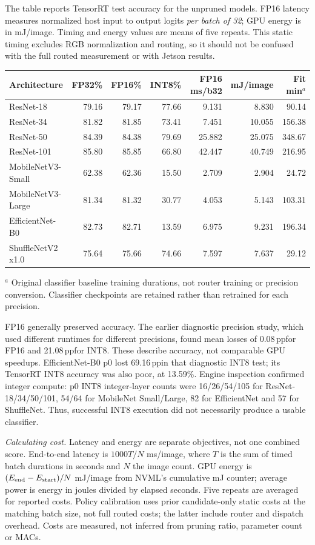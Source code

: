 \documentclass[10pt,a4paper]{article}
\newcommand{\pp}{\,pp}
\begin{document}
The table reports TensorRT test accuracy for the unpruned models. FP16 latency measures normalized host input to output logits \emph{per batch of 32}; GPU energy is in mJ/image. Timing and energy values are means of five repeats. This static timing excludes RGB normalization and routing, so it should not be confused with the full routed measurement or with Jetson results.

\begin{center}\small
\begin{tabular}{@{}lrrrrrr@{}}
\toprule Architecture & FP32\% & FP16\% & INT8\% & FP16 ms/b32 & mJ/image & Fit min$^{a}$ \\
\midrule
ResNet-18 &79.16&79.17&77.66&9.131&8.830&90.14\\
ResNet-34 &81.82&81.85&73.41&7.451&10.055&156.38\\
ResNet-50 &84.39&84.38&79.69&25.882&25.075&348.67\\
ResNet-101 &85.80&85.85&66.80&42.447&40.749&216.95\\
MobileNetV3-Small &62.38&62.36&15.50&2.709&2.904&24.72\\
MobileNetV3-Large &81.34&81.32&30.77&4.053&5.143&103.31\\
EfficientNet-B0 &82.73&82.71&13.59&6.975&9.231&196.34\\
ShuffleNetV2 x1.0 &75.64&75.66&74.66&7.597&7.637&29.12\\
\bottomrule
\end{tabular}
\end{center}
{\footnotesize $^{a}$ Original classifier baseline training durations, not router training or precision conversion. Classifier checkpoints are retained rather than retrained for each precision.}

FP16 generally preserved accuracy. The earlier diagnostic precision study, which used different runtimes for different precisions, found mean losses of 0.08\pp for FP16 and 21.08\pp for INT8. These describe accuracy, not comparable GPU speedups. EfficientNet-B0 p0 lost 69.16\pp in that diagnostic INT8 test; its TensorRT INT8 accuracy was also poor, at 13.59\%. Engine inspection confirmed integer compute: p0 INT8 integer-layer counts were 16/26/54/105 for ResNet-18/34/50/101, 54/64 for MobileNet Small/Large, 82 for EfficientNet and 57 for ShuffleNet. Thus, successful INT8 execution did not necessarily produce a usable classifier.

\textit{Calculating cost.} Latency and energy are separate objectives, not one combined score. End-to-end latency is $1000T/N$ ms/image, where $T$ is the sum of timed batch durations in seconds and $N$ the image count. GPU energy is $(E_{\rm end}-E_{\rm start})/N$ mJ/image from NVML's cumulative mJ counter; average power is energy in joules divided by elapsed seconds. Five repeats are averaged for reported costs. Policy calibration uses prior candidate-only static costs at the matching batch size, not full routed costs; the latter include router and dispatch overhead. Costs are measured, not inferred from pruning ratio, parameter count or MACs.
\end{document}
